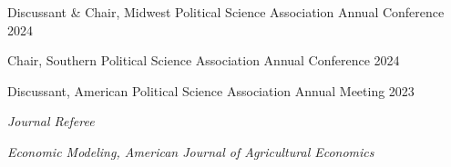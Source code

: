 \documentclass[10pt]{article}
\newcommand{\halfblankline}{\quad\vspace{-0.5\baselineskip}\pagebreak[3]}
\begin{document}
Discussant \& Chair, Midwest Political Science Association Annual Conference \hfill 2024

Chair, Southern Political Science Association Annual Conference \hfill 2024


Discussant, American Political Science Association Annual Meeting \hfill 2023

\halfblankline


\textit{Journal Referee}

\textit{Economic Modeling, American Journal of Agricultural Economics} 

\halfblankline











\end{document}
